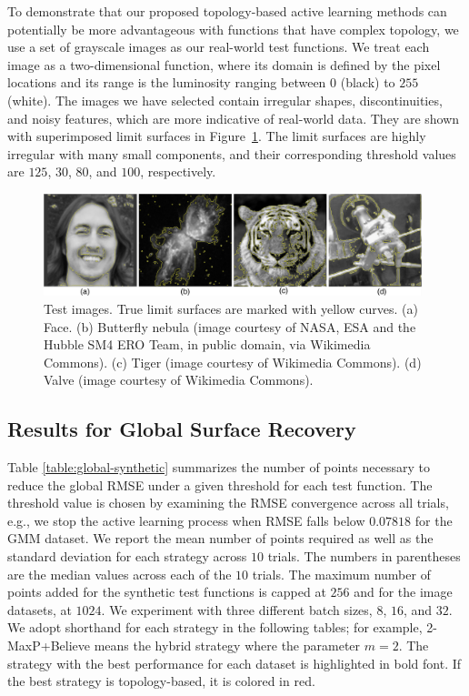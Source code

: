 To demonstrate that our proposed topology-based active learning methods can potentially be more advantageous with functions that have complex topology, we use a set of grayscale images as our real-world test functions.
%
We treat each image as a two-dimensional function, where its domain is defined by the pixel locations and its range is the luminosity ranging between $0$ (black) to $255$ (white).
%
The images we have selected contain irregular shapes, discontinuities, and noisy features, which are more indicative of real-world data.
%
They are shown with superimposed limit surfaces in Figure~\ref{fig:images}.
%
The limit surfaces are highly irregular with many small components, and their corresponding threshold values are $125$, $30$, $80$, and $100$, respectively.

\begin{figure}[!b]
\centering
\includegraphics[width=0.98\textwidth]{figs/chap5/images}
\caption[Test images for batch adaptive sampling]{Test images. True limit surfaces are marked with yellow curves.
%
(a) Face.
%
(b) Butterfly nebula (image courtesy of NASA, ESA and the Hubble SM4 ERO Team,
in public domain, via Wikimedia Commons).
%
(c) Tiger (image courtesy of Wikimedia Commons).
%
(d) Valve (image courtesy of Wikimedia Commons).}
\label{fig:images}
\end{figure}

\subsection{Results for Global Surface Recovery}
\label{sec:global_results}
%
Table \ref{table:global-synthetic} summarizes the number of points necessary to reduce the global RMSE under a given threshold for each test function.
%
The threshold value is chosen by examining the RMSE convergence across all trials, e.g., we stop the active learning process when RMSE falls below $0.07818$ for the GMM dataset.
%
We report the mean number of points required as well as the standard deviation for each strategy across $10$ trials.
%
The numbers in parentheses are the median values across each of the $10$ trials.
%
The maximum number of points added for the synthetic test functions is capped at $256$ and for the image datasets, at $1024$.
%
We experiment with three different batch sizes, $8$, $16$, and $32$.
%
We adopt shorthand for each strategy in the following tables; for example, 2-MaxP+Believe means the hybrid strategy where the parameter $m = 2$.
%
The strategy with the best performance for each dataset is highlighted in bold font.
%
If the best strategy is topology-based, it is colored in red.

